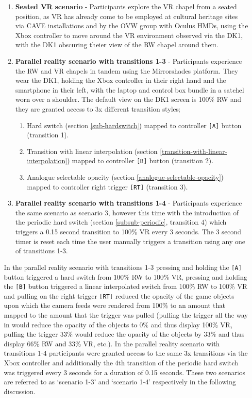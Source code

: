 \begin{enumerate}
	\item \textbf{Seated VR scenario} - Participants explore the VR chapel from a seated position, as VR has already come to be employed at cultural heritage sites via CAVE installations and by the OVW group with Oculus HMDs, using the Xbox controller to move around the VR environment observed via the DK1, with the DK1 obscuring theier view of the RW chapel around them.
	\item \textbf{Parallel reality scenario with transitions 1-3} - Participants experience the RW and VR chapels in tandem using the Mirrorshades platform. They wear the DK1, holding the Xbox controller in their right hand and the smartphone in their left, with the laptop and control box bundle in a satchel worn over a shoulder. The default view on the DK1 screen is 100\% RW and they are granted access to 3x different transition styles;
	\begin{enumerate}
		\item Hard switch (section \ref{sub-hardswitch}) mapped to controller \texttt{[A]} button (transition 1).
		\item Transition with linear interpolation (section \ref{transition-with-linear-interpolation}) mapped to controller \texttt{[B]} button (transition 2).
		\item Analogue selectable opacity (section \ref{analogue-selectable-opacity}) mapped to controller right trigger \texttt{[RT]} (transition 3).
\end{enumerate}
	\item \textbf{Parallel reality scenario with transitions 1-4} - Participants experience the same scenario as scenario 3, however this time with the introduction of the periodic hard switch (section \ref{subsub-periodic}, transition 4) which triggers a 0.15 second transition to 100\% VR every 3 seconds. The 3 second timer is reset each time the user manually triggers a transition using any one of transitions 1-3.
\end{enumerate}

In the parallel reality scenario with transitions 1-3 pressing and holding the \texttt{[A]} button triggered a hard switch from 100\% RW to 100\% VR, pressing and holding the \texttt{[B]} button triggered a linear interpolated switch from 100\% RW to 100\% VR and pulling on the right trigger \texttt{[RT]} reduced the opacity of the game objects upon which the camera feeds were rendered from 100\% to an amount that mapped to the amount that the trigger was pulled (pulling the trigger all the way in would reduce the opacity of the objects to 0\% and thus display 100\% VR, pulling the trigger 33\% would reduce the opacity of the objects by 33\% and thus display 66\% RW and 33\% VR, etc.). In the parallel reality scenario with transitions 1-4 participants were granted access to the same 3x transitions via the Xbox controller and additionally the 4th transition of the periodic hard switch was triggered every 3 seconds for a duration of 0.15 seconds. These two scenarios are referred to as `scenario 1-3' and `scenario 1-4' respectively in the following discussion.

